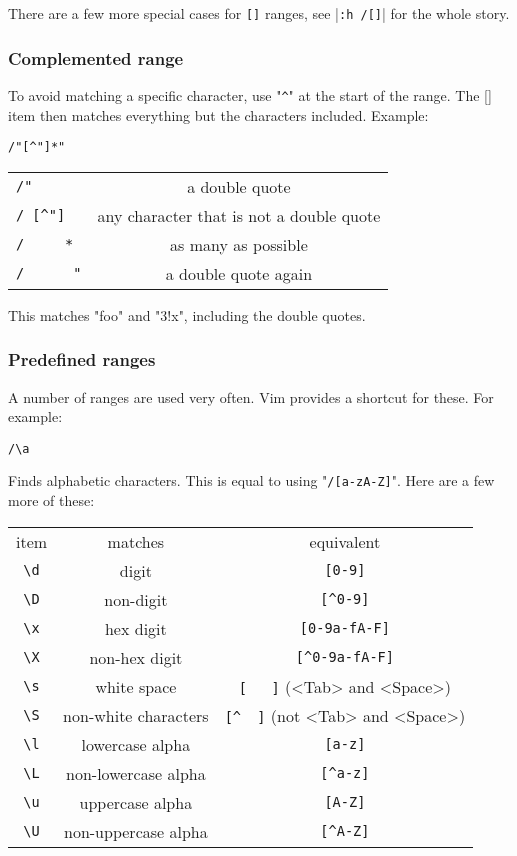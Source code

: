 There are a few more special cases for \verb![]! ranges, see |\verb!:h /[]!| for the whole story.
\subsubsection{Complemented range}
To avoid matching a specific character, use "\verb!^!" at the start of the range.
The [] item then matches everything but the characters included.
Example:

\begin{Verbatim}[samepage=true]
 /"[^"]*"
\end{Verbatim}

\begin{center} \begin{tabular}{c c}
				\verb!/"      ! & a double quote \\
				\verb!/ [^"]  ! & any character that is not a double quote \\
				\verb!/     * ! & as many as possible \\
				\verb!/      "! & a double quote again \\
\end{tabular} \end{center}

This matches "foo" and "3!x", including the double quotes.
\subsubsection{Predefined ranges}
A number of ranges are used very often.
Vim provides a shortcut for these.
For example:

\begin{Verbatim}[samepage=true]
 /\a
\end{Verbatim}

Finds alphabetic characters.
This is equal to using "\verb!/[a-zA-Z]!".
Here are a few more of these:

\begin{center} \begin{tabular}{c c c}
				item & matches & equivalent \\
				\verb!\d! & digit & \verb![0-9]!\\
				\verb!\D! & non-digit & \verb![^0-9]!\\
				\verb!\x! & hex digit & \verb![0-9a-fA-F]!\\
				\verb!\X! & non-hex digit & \verb![^0-9a-fA-F]!\\
				\verb!\s! & white space & \verb![   ]! (<Tab> and <Space>)\\
				\verb!\S! & non-white characters & \verb![^  ]! (not <Tab> and <Space>)\\
				\verb!\l! & lowercase alpha & \verb![a-z]!\\
				\verb!\L! & non-lowercase alpha & \verb![^a-z]!\\
				\verb!\u! & uppercase alpha & \verb![A-Z]!\\
				\verb!\U! & non-uppercase alpha & \verb![^A-Z]!\\
\end{tabular} \end{center}

